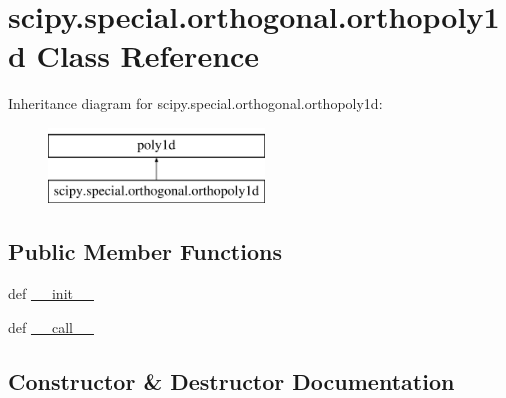 \hypertarget{classscipy_1_1special_1_1orthogonal_1_1orthopoly1d}{}\section{scipy.\+special.\+orthogonal.\+orthopoly1d Class Reference}
\label{classscipy_1_1special_1_1orthogonal_1_1orthopoly1d}
Inheritance diagram for scipy.\+special.\+orthogonal.\+orthopoly1d\+:\begin{figure}[H]
\begin{center}
\leavevmode
\includegraphics[height=2.000000cm]{classscipy_1_1special_1_1orthogonal_1_1orthopoly1d}
\end{center}
\end{figure}
\subsection*{Public Member Functions}
\begin{DoxyCompactItemize}
\item 
def \hyperlink{classscipy_1_1special_1_1orthogonal_1_1orthopoly1d_a6f166e0118c6832cea2eac5fc3251212}{\+\_\+\+\_\+init\+\_\+\+\_\+}
\item 
def \hyperlink{classscipy_1_1special_1_1orthogonal_1_1orthopoly1d_a2980b7ab0be7e7e6ce945b113c1213dd}{\+\_\+\+\_\+call\+\_\+\+\_\+}
\end{DoxyCompactItemize}


\subsection{Constructor \& Destructor Documentation}
\hypertarget{classscipy_1_1special_1_1orthogonal_1_1orthopoly1d_a6f166e0118c6832cea2eac5fc3251212}{}
